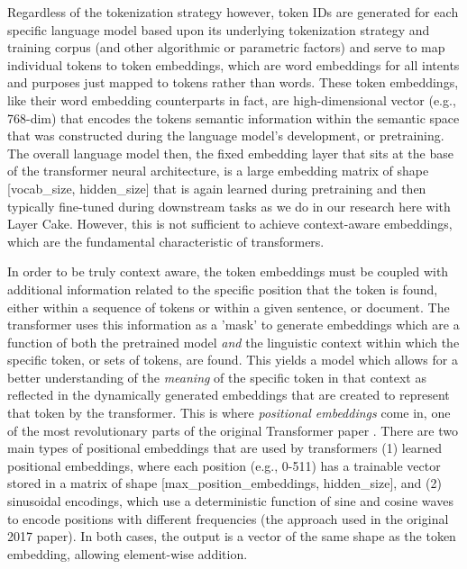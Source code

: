 \documentclass[final]{clv2025}
\begin{document}
Regardless of the tokenization strategy however, token IDs are generated for each specific language model based upon its underlying tokenization strategy and training corpus (and other algorithmic or parametric factors) and serve to map individual tokens to token embeddings, which are word embeddings for all intents and purposes just mapped to tokens rather than words. These token embeddings, like their word embedding counterparts in fact, are high-dimensional vector (e.g., 768-dim) that encodes the tokens semantic information within the semantic space that was constructed during the language model’s development, or pretraining. The overall language model then, the fixed embedding layer that sits at the base of the transformer neural architecture, is a large embedding matrix of shape [vocab\_size, hidden\_size] that is again learned during pretraining and then typically fine-tuned during downstream tasks as we do in our research here with Layer Cake. However, this is not sufficient to achieve context-aware embeddings, which are the fundamental characteristic of transformers. 

In order to be truly context aware, the token embeddings must be coupled with additional information related to the specific position that the token is found, either within a sequence of tokens or within a given sentence, or document. The transformer uses this information as a 'mask' to generate embeddings which are a function of both the pretrained model \textit{and} the linguistic context within which the specific token, or sets of tokens, are found. This yields a model which allows for a better understanding of the \textit{meaning} of the specific token in that context as reflected in the dynamically generated embeddings that are created to represent that token by the transformer. This is where \textit{positional embeddings} come in, one of the most revolutionary parts of the original Transformer paper \cite{vaswani}. There are two main types of positional embeddings that are used by transformers (1) learned positional embeddings, where each position (e.g., 0-511) has a trainable vector stored in a matrix of shape [max\_position\_embeddings, hidden\_size], and (2) sinusoidal encodings, which use a deterministic function of sine and cosine waves to encode positions with different frequencies (the approach used in the original 2017 paper). In both cases, the output is a vector of the same shape as the token embedding, allowing element-wise addition.
\end{document}
